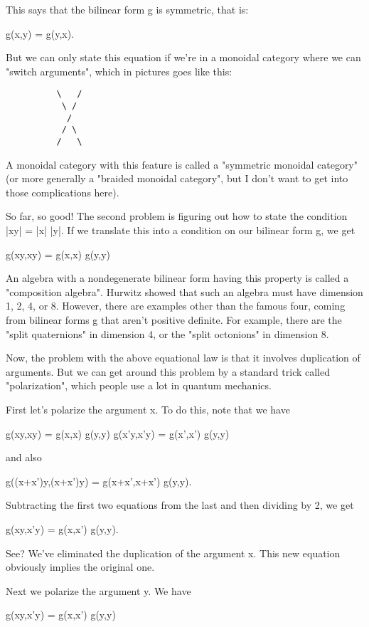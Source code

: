 This says that the bilinear form g is symmetric, that is:

g(x,y) = g(y,x).  

But we can only state this equation if we're in a monoidal category
where we can "switch arguments", which in pictures goes like this:

\begin{verbatim}
          \   /              
           \ /       
            /        
           / \       
          /   \   
\end{verbatim}
    
A monoidal category with this feature is called a "symmetric
monoidal category" (or more generally a "braided monoidal
category", but I don't want to get into those complications here).

So far, so good!  The second problem is figuring out how to state the
condition |xy| = |x| |y|.  If we translate this into a condition on our
bilinear form g, we get

g(xy,xy) = g(x,x) g(y,y)

An algebra with a nondegenerate bilinear form having this property is
called a "composition algebra".  Hurwitz showed that such an
algebra must have dimension 1, 2, 4, or 8.  However, there are examples
other than the famous four, coming from bilinear forms g that aren't
positive definite.  For example, there are the "split
quaternions" in dimension 4, or the "split octonions" in
dimension 8.

Now, the problem with the above equational law is that it involves
duplication of arguments.  But we can get around this problem by a
standard trick called "polarization", which people use a lot in 
quantum mechanics.   

First let's polarize the argument x.  To do this, note that we have

g(xy,xy) = g(x,x) g(y,y) 
g(x'y,x'y) = g(x',x') g(y,y)

and also

g((x+x')y,(x+x')y) = g(x+x',x+x') g(y,y).

Subtracting the first two equations from the last and then dividing by
2, we get

g(xy,x'y) = g(x,x') g(y,y).

See?  We've eliminated the duplication of the argument x.  This new
equation obviously implies the original one.  

Next we polarize the argument y.   We have

g(xy,x'y) = g(x,x') g(y,y)

